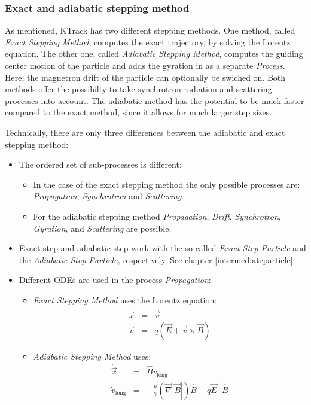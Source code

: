     
    \subsubsection*{Exact and adiabatic stepping method}
    \label{exactadiabatic}   
    As mentioned, KTrack has two different stepping methods. One method, called \textit{Exact Stepping Method}, computes the exact trajectory, by solving the Lorentz equation. The other one, called \textit{Adiabatic Stepping Method}, computes the guiding center motion of the particle and adds the gyration in as a separate \textit{Process}. Here, the magnetron drift of the particle can optionally be swiched on. Both methods offer the possibilty to take synchrotron radiation and scattering processes into account. The adiabatic method has the potential to be much faster compared to the exact method, since it allows for much larger step sizes.
    
    Technically, there are only three differences between the adiabatic and exact stepping method:
    \begin{itemize}
         \item The ordered set of sub-processes is different: 
         \begin{itemize}
             \item In the case of the exact stepping method the only possible processes are: \textit{Propagation}, \textit{Synchrotron} and \textit{Scattering}. 
             \item For the adiabatic stepping method \textit{Propagation}, \textit{Drift}, \textit{Synchrotron}, \textit{Gyration}, and \textit{Scattering} are possible.
         \end{itemize} 
         \item Exact step and adiabatic step work with the so-called \textit{Exact Step Particle} and the \textit{Adiabatic Step Particle}, respectively. See chapter \ref{intermediateparticle}.
        \item Different ODEs are used in the process \textit{Propagation}:
        \begin{itemize}
            \item \textit{Exact Stepping Method} uses the Lorentz equation: 
                \begin{eqnarray}
                    \dot {\vec{x}} &=& \vec{v} \\
                    \dot {\vec{v}} &=& q \left(\vec{E} + \vec{v} \times \vec{B} \right) 
                \end{eqnarray} 
            \item \textit{Adiabatic Stepping Method} uses:
                \begin{eqnarray}
                    \dot {\vec{x}} &=& \hat{B} v_{\mathrm{long}} \\
                    \dot {v}_{\mathrm{long}} &=& -\frac{\mu}{\gamma} \left(\vec{\nabla} |\vec{B}| \right) \hat{B} + q \vec{E} \cdot \hat{B}
                \end{eqnarray} 
        \end{itemize}
        
    \end{itemize}  

